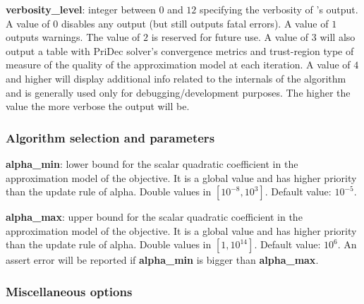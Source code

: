   \medskip

 \noindent \textbf{verbosity\_level}: integer between $0$ and $12$ specifying the verbosity of \Hi's output. A value of $0$ disables any output (but still outputs fatal errors). A value of $1$ outputs warnings. The value of $2$ is reserved for future use. A value of $3$ will also output a table with PriDec solver's convergence metrics and trust-region type of measure of the quality of the approximation model at each iteration. A value of $4$ and higher will display additional info related to the internals of the algorithm and is generally used only for debugging/development purposes. The higher the value the more verbose the output will be.


\subsubsection{Algorithm selection and parameters}
  \noindent \textbf{alpha\_min}: lower bound for the scalar quadratic coefficient in the approximation model of the objective. It is a global value and has higher priority than the update rule of alpha. Double values in $[10^{-8},10^3]$. Default value: $10^{-5}$.

  \medskip

  \noindent \textbf{alpha\_max}: upper bound for the scalar quadratic coefficient in the approximation model of the objective. It is a global value and has higher priority than the update rule of alpha. Double values in $[1,10^{14}]$. Default value: $10^6$. An assert error will be reported if \textbf{alpha\_min} is bigger than \textbf{alpha\_max}.
%

\subsubsection{Miscellaneous options}


